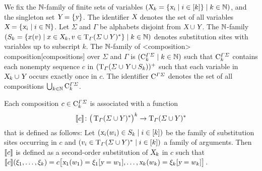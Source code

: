 \documentclass[../../document.tex]{subfiles}
\begin{document}
    \begin{definition}[Composition]
        We fix the \(\mathbb{N}\)-family of finite sets of variables \((\textsl{X}_k = \{\textsl{x}_i \mid i \in [k]\} \mid k \in \mathbb{N})\), and the singleton set \(\textsl{Y} = \{\textsl{y}\}\).
        The identifier \(\textsl{X}\) denotes the set of all variables \(\textsl{X} = \{\textsl{x}_i \mid i \in \mathbb{N}\}\).
        Let \(\varSigma\) and \(\varGamma\) be alphabets disjoint from \(\textsl{X} \cup \textsl{Y}\).
        The \(\mathbb{N}\)-family \((S_k = \{x(v) \mid x \in \textsl{X}_k, v \in \operatorname{T}_\varGamma(\varSigma \cup Y)^*\} \mid k \in \mathbb{N})\) denotes substitution sites with variables up to subscript \(k\).
        The \(\mathbb{N}\)-family of  <composition>{ composition}[compositions] over \(\varSigma\) and \(\varGamma\) is \((\mathrm{C}^{\varGamma\varSigma}_k \mid k \in \mathbb{N})\) such that \(\mathrm{C}^{\varGamma\varSigma}_k\) contains each nonempty sequence \(c\) in \((\operatorname{T}_\varGamma(\varSigma \cup \textsl{Y} \cup S_k))^+\) such that each variable in \(\textsl{X}_k \cup \textsl{Y}\) occurs exactly once in \(c\).
        The identifier \(\mathrm{C}^{\varGamma\varSigma}\) denotes the set of all  compositions \(\bigcup_{k \in \mathbb{N}} \mathrm{C}^{\varGamma\varSigma}_{k}\).

        Each composition \(c \in \mathrm{C}^{\varGamma\varSigma}_k\) is associated with a function \[
            \llbracket c\rrbracket\colon \big(\operatorname{T}_\varGamma(\varSigma \cup Y)^*\big)^k \to \operatorname{T}_\varGamma(\varSigma \cup Y)^*
        \] that is defined as follows:
            Let \((\textsl{x}_i(w_i) \in S_k \mid i \in [k])\) be the family of substitution sites occurring in \(c\) and \((v_i \in \operatorname{T}_\varGamma(\varSigma \cup Y)^* \mid i \in [k])\) a family of arguments.
            Then \(\llbracket c\rrbracket\) is defined as a second-order substitution of \(\textsl{X}_k\) in \(c\) such that \(\llbracket c\rrbracket(\xi_1, \ldots, \xi_k) = c\big[\textsl{x}_1(w_1)=\xi_1[\textsl{y}=w_1], \ldots, \textsl{x}_k(w_k)=\xi_k[\textsl{y}=w_k]\big]\).
    \end{definition}

\end{document}
